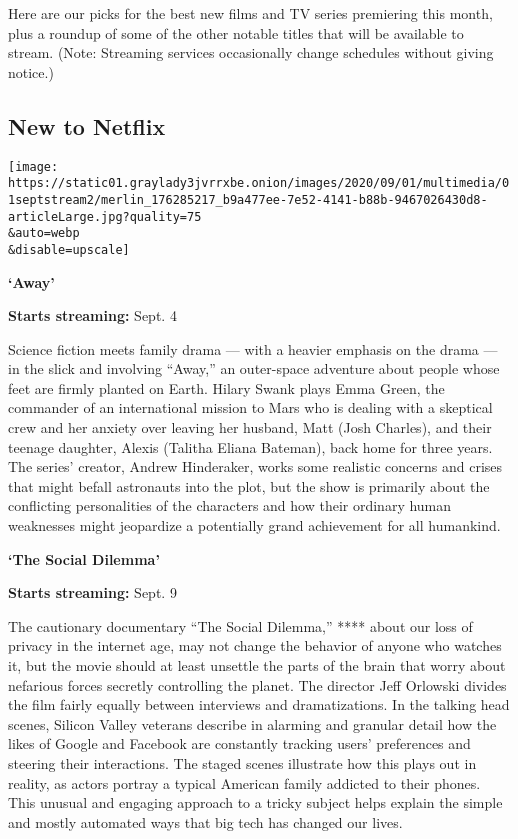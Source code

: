 Here are our picks for the best new films and TV series premiering this
month, plus a roundup of some of the other notable titles that will be
available to stream. (Note: Streaming services occasionally change
schedules without giving notice.)

\hypertarget{new-to-netflix}{%
\subsection{New to Netflix}\label{new-to-netflix}}

\texttt{[image: https://static01.graylady3jvrrxbe.onion/images/2020/09/01/multimedia/01septstream2/merlin\_176285217\_b9a477ee-7e52-4141-b88b-9467026430d8-articleLarge.jpg?quality=75\\\&auto=webp\\\&disable=upscale]}

\textbf{`Away'}

\textbf{Starts streaming:} Sept. 4

Science fiction meets family drama --- with a heavier emphasis on the
drama --- in the slick and involving ``Away,'' an outer-space adventure
about people whose feet are firmly planted on Earth. Hilary Swank plays
Emma Green, the commander of an international mission to Mars who is
dealing with a skeptical crew and her anxiety over leaving her husband,
Matt (Josh Charles), and their teenage daughter, Alexis (Talitha Eliana
Bateman), back home for three years. The series' creator, Andrew
Hinderaker, works some realistic concerns and crises that might befall
astronauts into the plot, but the show is primarily about the
conflicting personalities of the characters and how their ordinary human
weaknesses might jeopardize a potentially grand achievement for all
humankind.

\textbf{`The Social Dilemma'}

\textbf{Starts streaming:} Sept. 9

The cautionary documentary ``The Social Dilemma,'' **** about our loss
of privacy in the internet age, may not change the behavior of anyone
who watches it, but the movie should at least unsettle the parts of the
brain that worry about nefarious forces secretly controlling the planet.
The director Jeff Orlowski divides the film fairly equally between
interviews and dramatizations. In the talking head scenes, Silicon
Valley veterans describe in alarming and granular detail how the likes
of Google and Facebook are constantly tracking users' preferences and
steering their interactions. The staged scenes illustrate how this plays
out in reality, as actors portray a typical American family addicted to
their phones. This unusual and engaging approach to a tricky subject
helps explain the simple and mostly automated ways that big tech has
changed our lives.


